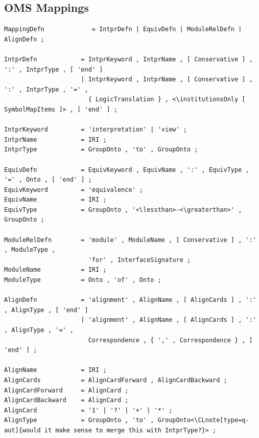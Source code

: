\documentclass[10pt,%
\ifpretendfinal
final%
\else
draft%
\fi,
]{scrreprt}
\makeatletter
\newcommand*\CommentAuthor{}
\renewcommand*\CommentAuthor{#1}}
\newcommand*\CommentDate{}
\renewcommand*\CommentDate{#1}}
\newcommand*\CommentId{}
\renewcommand*\CommentId{#1}}
\newcommand*\CommentType{}
\renewcommand*\CommentType{#1}}
\newcommand*{\SetCommentColorByType}[1]{%
\edef\localType{{#1}}%
\expandafter\ifstrequal\localType{q-aut}{\colorlet{CommentColor}{red}}{%
\expandafter\ifstrequal\localType{q-all}{\colorlet{CommentColor}{orange}}{%
\expandafter\ifstrequal\localType{todo}{\colorlet{CommentColor}{orange}}{%
\expandafter\ifstrequal\localType{fyi}{\colorlet{CommentColor}{lightgray}}{%
\colorlet{CommentColor}{yellow}}}}}}
\newcommand*{\SetCommentPrefixByType}[1]{%
\edef\localType{{#1}}%
\expandafter\@ifmtarg\localType{%
\edef\CommentPrefix{}%
}{%
\caseupper[q]{#1}%
\edef\CommentPrefix{\thestring: }%
}}
\newcommand*{\initComment}[1]{%
\setkeys{Comment}{#1}%
\SetCommentColorByType{\CommentType}%
\relax%
\SetCommentPrefixByType{\CommentType}%
\relax%
}
\newcommand*{\todonote}[2][]{%
\initComment{#1}%
\pdfcomment[author=\CommentAuthor,color=CommentColor,date=\CommentDate,id=\CommentId]{%
\CommentPrefix
#2}}
\renewcommand*{\todonote}[2][]{%
\initComment{#1}%
\ednote{\CommentPrefix #2}}
\newcommand*{\CLnote}[2][author=Christoph Lange]{%
\todonote[author=Christoph Lange,#1]{#2} 
}
\newcommand*{\institutionsOnly}{\bfseries\itshape}
\newcommand{\ssclause}[1]{\subsection{#1}}
\makeatother
\begin{document}
\ssclause{OMS Mappings}

\newcommand*{\lessthan}{<}
\newcommand*{\greaterthan}{>}
\begin{lstlisting}[language=ebnf,escapeinside={<>}]
MappingDefn             = IntprDefn | EquivDefn | ModuleRelDefn | AlignDefn ;

IntprDefn            = IntprKeyword , IntprName , [ Conservative ] , ':' , IntprType , [ 'end' ]
                     | IntprKeyword , IntprName , [ Conservative ] , ':' , IntprType , '=' ,
                       { LogicTranslation } , <\institutionsOnly [ SymbolMapItems ]> , [ 'end' ] ;

IntprKeyword         = 'interpretation' | 'view' ;
IntprName            = IRI ;
IntprType            = GroupOnto , 'to' , GroupOnto ;

EquivDefn            = EquivKeyword , EquivName , ':' , EquivType , '=' , Onto , [ 'end' ] ;
EquivKeyword         = 'equivalence' ;
EquivName            = IRI ;
EquivType            = GroupOnto , '<\lessthan>-<\greaterthan>' , GroupOnto ;

ModuleRelDefn        = 'module' , ModuleName , [ Conservative ] , ':' , ModuleType ,
                       'for' , InterfaceSignature ;
ModuleName           = IRI ;
ModuleType           = Onto , 'of' , Onto ;

AlignDefn            = 'alignment' , AlignName , [ AlignCards ] , ':' , AlignType , [ 'end' ]
                     | 'alignment' , AlignName , [ AlignCards ] , ':' , AlignType , '=' ,
                       Correspondence , { ',' , Correspondence } , [ 'end' ] ;

AlignName            = IRI ;
AlignCards           = AlignCardForward , AlignCardBackward ;
AlignCardForward     = AlignCard ;
AlignCardBackward    = AlignCard ;
AlignCard            = '1' | '?' | '+' | '*' ;
AlignType            = GroupOnto , 'to' , GroupOnto<\CLnote[type=q-aut]{would it make sense to merge this with IntprType?}> ;


\end{lstlisting}
\end{document}
